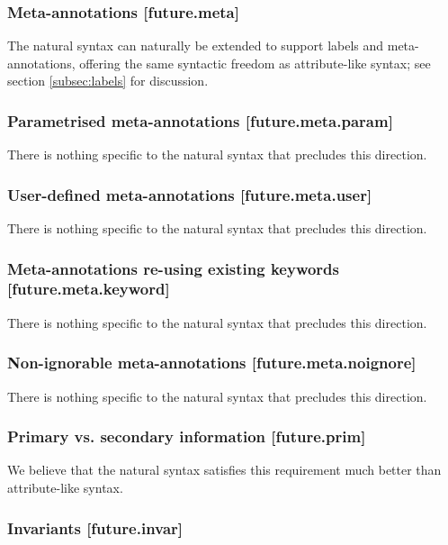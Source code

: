 \subsubsection{Meta-annotations  [future.meta]}

The natural syntax can naturally be extended to support labels and meta-annotations, offering the same syntactic freedom as attribute-like syntax; see section \ref{subsec:labels} for discussion.

\subsubsection{Parametrised meta-annotations  [future.meta.param]}

There is nothing specific to the natural syntax that precludes this direction.

\subsubsection{User-defined meta-annotations  [future.meta.user]}

There is nothing specific to the natural syntax that precludes this direction.

\subsubsection{Meta-annotations re-using existing keywords  [future.meta.keyword]}

There is nothing specific to the natural syntax that precludes this direction.

\subsubsection{Non-ignorable meta-annotations  [future.meta.noignore]}

There is nothing specific to the natural syntax that precludes this direction.

\subsubsection{Primary vs. secondary information  [future.prim]}

We believe that the natural syntax satisfies this requirement much better than attribute-like syntax.

\subsubsection{Invariants  [future.invar]}

